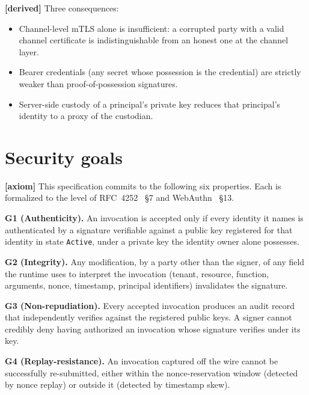 \documentclass[11pt,a4paper]{article}
\newcommand{\axiom}{\textcolor{axiomcolor}{\textbf{[axiom]}}\xspace}
\newcommand{\derived}{\textcolor{derivedcolor}{\textbf{[derived]}}\xspace}
\begin{document}
\derived{} Three consequences:

\begin{itemize}[leftmargin=2em,itemsep=0.2em]
    \item Channel-level mTLS alone is insufficient: a corrupted party
    with a valid channel certificate is indistinguishable from an
    honest one at the channel layer.
    \item Bearer credentials (any secret whose possession is the
    credential) are strictly weaker than proof-of-possession
    signatures.
    \item Server-side custody of a principal's private key reduces
    that principal's identity to a proxy of the custodian.
\end{itemize}

\section{Security goals}
\label{sec:goals}

\axiom{} This specification commits to the following six properties.
Each is formalized to the level of RFC~4252~\cite{rfc4252} \S7 and
WebAuthn~\cite{webauthn} \S13.

\begin{property}
\textbf{G1 (Authenticity).}
An invocation is accepted only if every identity it names is
authenticated by a signature verifiable against a public key registered
for that identity in state \texttt{Active}, under a private key the
identity owner alone possesses.
\end{property}

\begin{property}
\textbf{G2 (Integrity).}
Any modification, by a party other than the signer, of any field the
runtime uses to interpret the invocation
(tenant, resource, function, arguments, nonce, timestamp, principal
identifiers) invalidates the signature.
\end{property}

\begin{property}
\textbf{G3 (Non-repudiation).}
Every accepted invocation produces an audit record that independently
verifies against the registered public keys. A signer cannot credibly
deny having authorized an invocation whose signature verifies under its
key.
\end{property}

\begin{property}
\textbf{G4 (Replay-resistance).}
An invocation captured off the wire cannot be successfully re-submitted,
either within the nonce-reservation window (detected by nonce replay)
or outside it (detected by timestamp skew).
\end{property}
\end{document}

